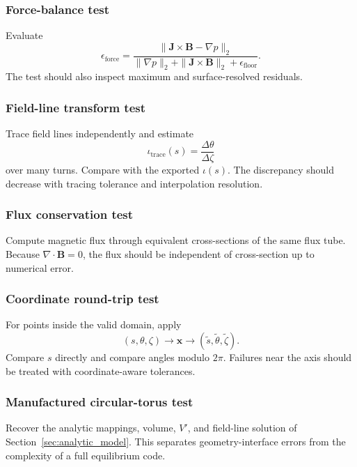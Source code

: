 \subsubsection{Force-balance test}
Evaluate
\begin{equation}
\epsilon_{\mathrm{force}}
=\frac{\|\mathbf J\times\mathbf B-\nabla p\|_2}
{\|\nabla p\|_2+\|\mathbf J\times\mathbf B\|_2+\epsilon_{\mathrm{floor}}}.
\end{equation}
The test should also inspect maximum and surface-resolved residuals.

\subsubsection{Field-line transform test}
Trace field lines independently and estimate
\begin{equation}
\iota_{\mathrm{trace}}(s)
=\frac{\Delta\theta}{\Delta\zeta}
\end{equation}
over many turns. Compare with the exported $\iota(s)$. The discrepancy should decrease with tracing tolerance and interpolation resolution.

\subsubsection{Flux conservation test}
Compute magnetic flux through equivalent cross-sections of the same flux tube. Because $\nabla\cdot\mathbf B=0$, the flux should be independent of cross-section up to numerical error.

\subsubsection{Coordinate round-trip test}
For points inside the valid domain, apply
\begin{equation}
(s,\theta,\zeta)\rightarrow\mathbf x
\rightarrow(\tilde s,\tilde\theta,\tilde\zeta).
\end{equation}
Compare $s$ directly and compare angles modulo $2\pi$. Failures near the axis should be treated with coordinate-aware tolerances.

\subsubsection{Manufactured circular-torus test}
Recover the analytic mappings, volume, $V'$, and field-line solution of Section~\ref{sec:analytic_model}. This separates geometry-interface errors from the complexity of a full equilibrium code.

